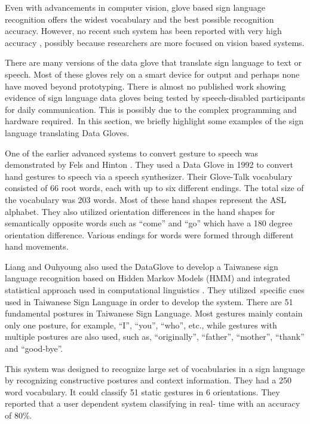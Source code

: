 Even with advancements in computer vision, glove based sign language recognition offers the widest vocabulary and the best possible recognition accuracy. However, no recent such system has been reported with very high accuracy \parencite{Premaratne2010}, possibly because researchers are more focused on vision based systems. 

There are many versions of the data glove that translate sign language to text or speech. Most of these gloves rely on a smart device for output and perhaps none have moved beyond prototyping. There is almost no published work showing evidence of sign language data gloves being tested by speech-disabled participants for daily communication. This is possibly due to the complex programming and hardware required. In this section, we briefly highlight some examples of the sign language translating Data Gloves.

One of the earlier advanced systems to convert gesture to speech was demonstrated by Fels and Hinton \parencite{Fels1993}. They used a Data Glove in 1992 to convert hand gestures to speech via a speech synthesizer. Their Glove-Talk vocabulary consisted of 66 root words, each with up to six different endings. The total size of the vocabulary was 203 words. Most of these hand shapes represent the ASL alphabet. They also utilized orientation differences in the hand shapes for semantically opposite words such as ``come'' and ``go'' which have a 180 degree orientation difference. Various endings for words were formed through different hand movements. 

Liang and Ouhyoung also used the DataGlove to develop a Taiwanese sign language recognition based on Hidden Markov Models (HMM) and integrated statistical approach used in computational linguistics \parencite{Liang1998}. They utilized specific cues used in Taiwanese Sign Language in order to develop the system. There are 51 fundamental postures in Taiwanese Sign Language. Most gestures mainly contain only one posture, for example, ``I'', ``you'', ``who'', etc., while gestures with multiple postures are also used, such as, ``originally'', ``father'', ``mother'', ``thank'' and ``good-bye''. 

This system was designed to recognize large set of vocabularies in a sign language by recognizing constructive postures and context information. They had a 250 word vocabulary. It could classify 51 static gestures in 6 orientations. They reported that a user dependent system classifying in real- time with an accuracy of 80\%.

